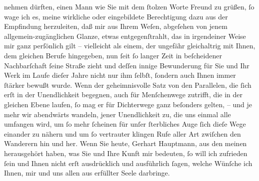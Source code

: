                nehmen dürften, einen Mann wie Sie mit dem ſtolzen Worte Freund zu grüßen, ſo wage
               ich es, meine wirkliche oder eingebildete Berechtigung dazu aus der Empfindung
               herzuleiten, daß mir aus Ihrem Weſen, abgeſehen von jenem allgemein-zugänglichen
               Glanze, etwas entgegenſtrahlt, das in irgendeiner Weise mir ganz perſönlich gilt –
               vielleicht als einem, der ungefähr gleichaltrig mit Ihnen, dem gleichen Berufe
               hingegeben, nun ſeit ſo langer Zeit in beſcheidener Nachbarſchaft ſeine Straße zieht
               und deſſen innige Bewunderung für Sie und Ihr Werk im Laufe dieſer Jahre nicht nur
               ihm ſelbſt, ſondern auch Ihnen immer ſtärker bewußt wurde. Wenn der geheimnisvolle
               Satz von den Parallelen, die ſich erſt in der Unendlichkeit begegnen, auch für
               Menſchenwege zutrifft, die in der gleichen Ebene laufen, ſo mag er für Dichterwege
               ganz beſonders gelten, – und je mehr wir abendwärts wandeln, jener Unendlichkeit zu,
               die uns einmal alle umfangen wird, um ſo mehr ſcheinen für unſer ſterbliches Auge
               ſich dieſe Wege einander zu nähern und um ſo vertrauter klingen Rufe aller Art
               zwiſchen den Wanderern hin und her. Wenn Sie heute, Gerhart Hauptmann, aus den meinen
               herausgehört haben, was Sie und Ihre Kunft mir bedeuten, ſo will ich zufrieden ſein
               und Ihnen nicht erſt ausdrücklich und ausführlich ſagen, welche Wünſche ich Ihnen,
               mir und uns allen aus erfüllter Seele darbringe.\pend
           \endnumbering{}  
      